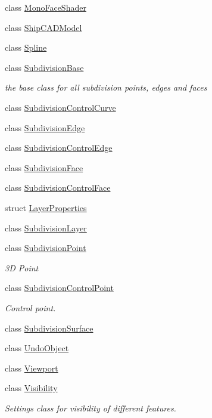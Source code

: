 \begin{DoxyCompactItemize}
class \hyperlink{classShipCAD_1_1MonoFaceShader}{Mono\-Face\-Shader}
\item 
class \hyperlink{classShipCAD_1_1ShipCADModel}{Ship\-C\-A\-D\-Model}
\item 
class \hyperlink{classShipCAD_1_1Spline}{Spline}
\item 
class \hyperlink{classShipCAD_1_1SubdivisionBase}{Subdivision\-Base}
\begin{DoxyCompactList}\small\item\em the base class for all subdivision points, edges and faces \end{DoxyCompactList}\item 
class \hyperlink{classShipCAD_1_1SubdivisionControlCurve}{Subdivision\-Control\-Curve}
\item 
class \hyperlink{classShipCAD_1_1SubdivisionEdge}{Subdivision\-Edge}
\item 
class \hyperlink{classShipCAD_1_1SubdivisionControlEdge}{Subdivision\-Control\-Edge}
\item 
class \hyperlink{classShipCAD_1_1SubdivisionFace}{Subdivision\-Face}
\item 
class \hyperlink{classShipCAD_1_1SubdivisionControlFace}{Subdivision\-Control\-Face}
\item 
struct \hyperlink{structShipCAD_1_1LayerProperties}{Layer\-Properties}
\item 
class \hyperlink{classShipCAD_1_1SubdivisionLayer}{Subdivision\-Layer}
\item 
class \hyperlink{classShipCAD_1_1SubdivisionPoint}{Subdivision\-Point}
\begin{DoxyCompactList}\small\item\em 3\-D Point \end{DoxyCompactList}\item 
class \hyperlink{classShipCAD_1_1SubdivisionControlPoint}{Subdivision\-Control\-Point}
\begin{DoxyCompactList}\small\item\em Control point. \end{DoxyCompactList}\item 
class \hyperlink{classShipCAD_1_1SubdivisionSurface}{Subdivision\-Surface}
\item 
class \hyperlink{classShipCAD_1_1UndoObject}{Undo\-Object}
\item 
class \hyperlink{classShipCAD_1_1Viewport}{Viewport}
\item 
class \hyperlink{classShipCAD_1_1Visibility}{Visibility}
\begin{DoxyCompactList}\small\item\em Settings class for visibility of different features. \end{DoxyCompactList}\end{DoxyCompactItemize}
